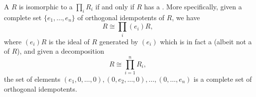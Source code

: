 \begin{proposition} \label{proposition:ring_is_product_ring_if_and_ony_if_it_has_central_orthogonal_idempotents}
    A  $R$ is isomorphic to a  $\prod_i R_i$ if and only if $R$ has a   . More specifically, given a complete set $\{e_1,\ldots,e_n\}$ of orthogonal idempotents of $R$, we have
    $$R \cong \prod_i (e_i) R,$$
    where $(e_i) R$ is the ideal of $R$ generated by $(e_i)$ which is in fact a  (albeit not a  of $R$), and given a decomposition
    $$R \cong \prod_{i=1}^n R_i,$$
    the set of elements $(e_1,0,\ldots,0), (0,e_2,\ldots,0), \ldots, (0,\ldots,e_n)$ is a complete set of orthogonal idempotents.
\end{proposition}

